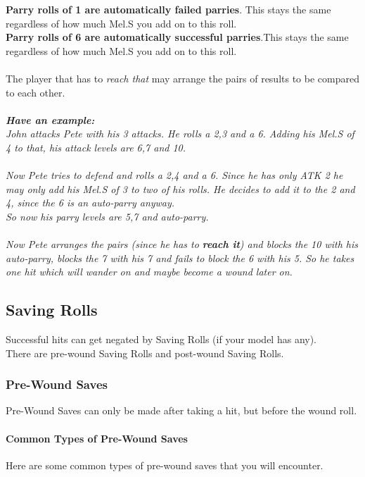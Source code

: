 \documentclass[
	11pt,
	toc=bibliography
	]{article}
\begin{document}
\textbf{Parry rolls of 1 are automatically failed parries}. This stays the same regardless of how much Mel.S you add on to this roll.\\
\textbf{Parry rolls of 6 are automatically successful parries}.This stays the same regardless of how much Mel.S you add on to this roll.\\\\
The player that has to \textit{reach that} may arrange the pairs of results to be compared to each other.\\\\
\textit{\textbf{Have an example:} \\
John attacks Pete with his 3 attacks. He rolls a 2,3 and a 6. Adding his Mel.S of 4 to that, his attack levels are 6,7 and 10.\\\\
Now Pete tries to defend and rolls a 2,4 and a 6. Since he has only ATK 2 he may only add his Mel.S of 3 to two of his rolls. He decides to add it to the 2 and 4, since the 6 is an auto-parry anyway. \\
So now his parry levels are 5,7 and auto-parry.\\\\
Now Pete arranges the pairs (since he has to \textbf{reach it}) and blocks the 10 with his auto-parry, blocks the 7 with his 7 and fails to block the 6 with his 5. So he takes one hit which will wander on and maybe become a wound later on.
}

\subsection{Saving Rolls}\label{savingRolls}
Successful hits can get negated by Saving Rolls (if your model has any).\\
There are pre-wound Saving Rolls and post-wound Saving Rolls.

\subsubsection{Pre-Wound Saves}\label{preWound}
Pre-Wound Saves can only be made after taking a hit, but before the wound roll.

\paragraph{Common Types of Pre-Wound Saves}
Here are some common types of pre-wound saves that you will encounter.
\end{document}
